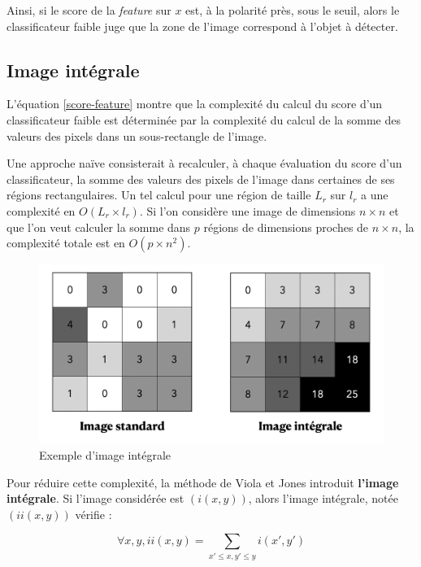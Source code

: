 \documentclass[12pt,a4paper]{article}
\begin{document}
Ainsi, si le score de la \textit{feature} sur $x$ est, à la polarité près, sous le seuil, alors le classificateur faible juge que la zone de l'image correspond à l'objet à détecter.

\subsection{Image intégrale}
L'équation \ref{score-feature} montre que la complexité du calcul du score d'un classificateur faible est déterminée par la complexité du calcul de la somme des valeurs des pixels dans un sous-rectangle de l'image.

Une approche naïve consisterait à recalculer, à chaque évaluation du score d'un classificateur, la somme des valeurs des pixels de l'image dans certaines de ses régions rectangulaires. Un tel calcul pour une région de taille $L_r$ sur $l_r$ a une complexité en $O(L_r \times l_r)$. Si l'on considère une image de dimensions $n \times n$ et que l'on veut calculer la somme dans $p$ régions de dimensions proches de $n \times n$, la complexité totale est en $O(p \times n^2)$.

\begin{figure}
        \includegraphics[scale = 0.35]{image-integrale2}
        \centering
        \caption{Exemple d'image intégrale}
\end{figure}

Pour réduire cette complexité, la méthode de Viola et Jones introduit \textbf{l'image intégrale}. Si l'image considérée est $(i(x, y))$, alors l'image intégrale, notée $(ii(x, y))$ vérifie :

\begin{equation}
    \forall x, y, ii(x, y) = \sum_{x' \leq x, y' \leq y} i(x', y')
\end{equation}
\end{document}
